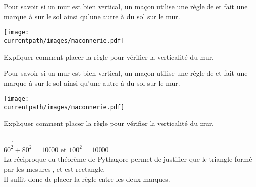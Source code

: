 \begin{exercice*}
    Pour savoir si un mur est bien vertical, un ma\c con utilise une règle de  et fait une marque à  sur le sol ainsi qu'une autre à 
     du sol sur le mur.

    \begin{minipage}{0.5\linewidth}
        \texttt{[image: \\currentpath/images/maconnerie.pdf]}
    \end{minipage}
    \begin{minipage}{0.5\linewidth}
        Expliquer comment placer la règle pour vérifier la verticalité du mur.
    \end{minipage}    
\end{exercice*}
\begin{corrige}
    Pour savoir si un mur est bien vertical, un ma\c con utilise une règle de  et fait une marque à  sur le sol ainsi qu'une autre à 
     du sol sur le mur.

    \begin{minipage}{0.45\linewidth}
        \texttt{[image: \\currentpath/images/maconnerie.pdf]}
    \end{minipage}
    \hfill
    \begin{minipage}{0.5\linewidth}
        Expliquer comment placer la règle pour vérifier la verticalité du mur.
    \end{minipage}  

    \medskip
    {\red {} = .\\
    $60^2+80^2=\num{10000}$ et $100^2=\num{10000}$\\
    La réciproque du théorème de Pythagore permet de justifier que le triangle formé par les mesures ,  et  est rectangle.\\
    Il suffit donc de placer la règle entre les deux marques.}
\end{corrige}

